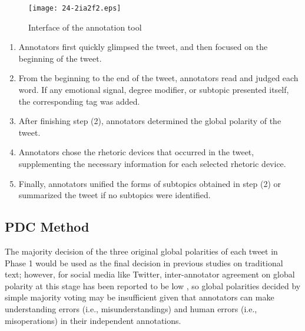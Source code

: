 \documentclass[english]{jnlp_1.4}
\begin{document}
\begin{figure}[t]
\begin{center}
\texttt{[image: 24-2ia2f2.eps]}
\end{center}
\caption{Interface of the annotation tool}
\label{fig:interface}
\end{figure}

\begin{enumerate}
\item Annotators first quickly glimpsed the tweet, and then focused on the beginning of the tweet.
\item From the beginning to the end of the tweet, annotators read and judged each word. If any emotional signal, degree modifier, or subtopic presented itself, the corresponding tag was added.
\item After finishing step (2), annotators determined the global polarity of the tweet.
\item Annotators chose the rhetoric devices that occurred in the tweet, supplementing the necessary information for each selected rhetoric device.
\item Finally, annotators unified the forms of subtopics obtained in step (2) or summarized the tweet if no subtopics were identified.
\end{enumerate}


\subsection{PDC Method}

The majority decision of the three original global polarities of each tweet in Phase 1 would be used as the final decision in previous studies on traditional text; however, for social media like Twitter, inter-annotator agreement on global polarity at this stage has been reported to be low \cite{Sang12,Basile13}, so global polarities decided by simple majority voting may be insufficient given that annotators can make understanding errors (i.e., misunderstandings) and human errors (i.e., misoperations) in their independent annotations.
\end{document}
